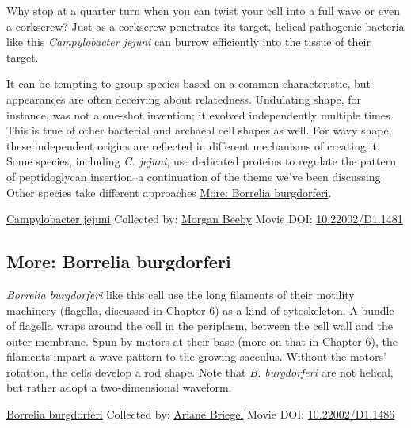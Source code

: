 \documentclass[]{tufte-book}
\begin{document}
Why stop at a quarter turn when you can twist your cell into a full wave or even a corkscrew? Just as a corkscrew penetrates its target, helical pathogenic bacteria like this \emph{Campylobacter jejuni} can burrow efficiently into the tissue of their target.

It can be tempting to group species based on a common characteristic, but appearances are often deceiving about relatedness. Undulating shape, for instance, was not a one-shot invention; it evolved independently multiple times. This is true of other bacterial and archaeal cell shapes as well. For wavy shape, these independent origins are reflected in different mechanisms of creating it. Some species, including \emph{C. jejuni}, use dedicated proteins to regulate the pattern of peptidoglycan insertion--a continuation of the theme we've been discussing. Other species take different approaches \protect\hyperlink{Borrelia_burgdorferi}{More: Borrelia burgdorferi}.



\hypertarget{htmlwidget-e4510b0428cde0dcbbfe}{}

\label{fig:3-5}\protect\hyperlink{tree}{Campylobacter jejuni} Collected by: \protect\hyperlink{morgan_beeby}{Morgan Beeby} Movie DOI: \href{https://doi.org/10.22002/D1.1481}{10.22002/D1.1481}

\hypertarget{Borrelia_burgdorferi}{%
\subsection*{More: Borrelia burgdorferi}\label{Borrelia_burgdorferi}}

\emph{Borrelia burgdorferi} like this cell use the long filaments of their motility machinery (flagella, discussed in Chapter 6) as a kind of cytoskeleton. A bundle of flagella wraps around the cell in the periplasm, between the cell wall and the outer membrane. Spun by motors at their base (more on that in Chapter 6), the filaments impart a wave pattern to the growing sacculus. Without the motors' rotation, the cells develop a rod shape. Note that \emph{B. burgdorferi} are not helical, but rather adopt a two-dimensional waveform.



\hypertarget{htmlwidget-5469bbb227b42e0fdc22}{}

\label{fig:3-5a}\protect\hyperlink{tree}{Borrelia burgdorferi} Collected by: \protect\hyperlink{ariane_briegel}{Ariane Briegel} Movie DOI: \href{https://doi.org/10.22002/D1.1486}{10.22002/D1.1486}
\end{document}
